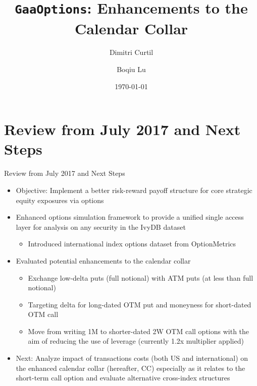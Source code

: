 \documentclass{beamer}
\title[{\tt GaaOptions}]{{\tt GaaOptions}: Enhancements to the Calendar Collar}
\author[DC $|$ BL]{Dimitri Curtil  \and Boqiu Lu}
\date{\today}
\begin{document}
\begin{frame}
  \titlepage
\end{frame}

\section{Review from July 2017 and Next Steps}
\begin{frame}{Review from July 2017 and Next Steps}
\begin{itemize}
\item Objective: Implement a better risk-reward payoff structure for core strategic equity exposures via options
\vfill
\item Enhanced options simulation framework to provide a unified single access layer for analysis on any security in the IvyDB dataset
\begin{itemize}
	\item Introduced international index options dataset from OptionMetrics
\end{itemize}
\vfill
\item Evaluated potential enhancements to the calendar collar
	\begin{itemize}
	\item Exchange low-delta puts (full notional) with ATM puts (at less than full notional)
	\item Targeting delta for long-dated OTM put and moneyness for short-dated OTM call
	\item Move from writing 1M to shorter-dated 2W OTM call options with the aim of reducing the use of leverage (currently 1.2x multiplier applied)
	\end{itemize}
\item Next: Analyze impact of transactions costs (both US and international) on the enhanced calendar collar (hereafter, CC) especially as it relates to the short-term call option and evaluate alternative cross-index structures
\vfill
\end{itemize}
\end{frame}
\end{document}
